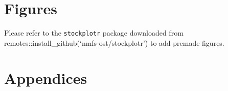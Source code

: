 \documentclass[
  letterpaper,
]{article}
\begin{document}
\clearpage

\newpage{}

\section{Figures}\label{sec-figures}

Please refer to the \texttt{stockplotr} package downloaded from
remotes::install\_github(`nmfs-ost/stockplotr') to add premade figures.

\newpage{}

\appendix
\setcounter{figure}{0}
\setcounter{table}{0}

\section{Appendices}\label{sec-appendix}
\end{document}
